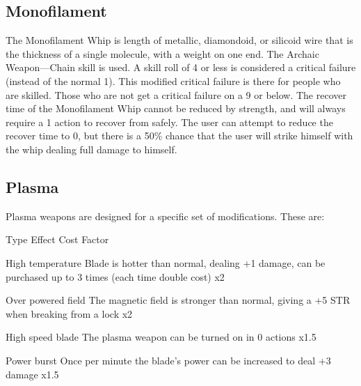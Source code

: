 \documentclass[twoside]{book}
\begin{document}
\subsection{Monofilament}
      The Monofilament Whip is length of metallic,
               diamondoid, or silicoid wire that is the thickness of a
               single molecule, with a weight on one end. The Archaic
               Weapon—Chain skill is used. A skill roll of 4 or
               less is considered a critical failure (instead of the
               normal 1). This modified critical failure is there for
               people who are skilled. Those who are not get a critical
               failure on a 9 or below.   The recover time of the Monofilament Whip cannot be
               reduced by strength, and will always require a 1 action to
               recover from safely. The user can attempt to reduce the
               recover time to 0, but there is a 50\% chance that the user
               will strike himself with the whip dealing full damage to
               himself. 
\subsection{Plasma}
      Plasma weapons are designed for a specific set of
               modifications. These are:   
                
                  
                   Type 
                   Effect 
                   Cost Factor   
                  
                  
                   High temperature   
                     Blade is hotter than normal, dealing +1
                     damage, can be purchased up to 3 times (each time
                     double cost) 
                   x2   
                  
                  
                   Over powered field   
                     The magnetic field is stronger than normal,
                     giving a +5 STR when breaking from a lock 
                   x2   
                  
                  
                   High speed blade   
                     The plasma weapon can be turned on in 0
                     actions 
                   x1.5   
                  
                  
                   Power burst   
                     Once per minute the blade’s power can be
                     increased to deal +3 damage 
                   x1.5   
                  
\end{document}
